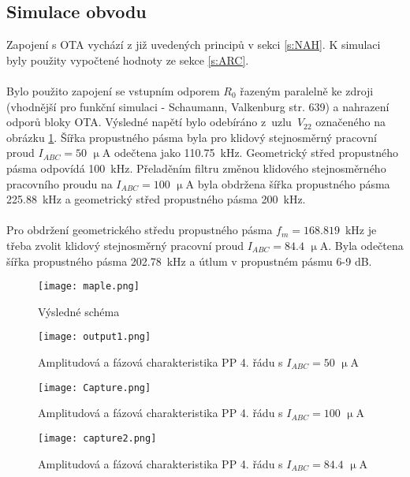 \subsection{Simulace obvodu}
\noindent  Zapojení s OTA vychází z již uvedených principů v sekci \ref{s:NAH}. K simulaci byly použity vypočtené hodnoty ze sekce \ref{s:ARC}. \\
\\
\noindent Bylo použito zapojení se vstupním odporem $R_0$ řazeným paralelně ke zdroji (vhodnější pro funkční simulaci - Schaumann, Valkenburg \cite{13} str. 639) a nahrazení odporů bloky OTA. Výsledné napětí bylo odebíráno z~uzlu~$V_{22}$ označeného na obrázku \ref{s:V1}. Šířka propustného pásma byla pro klidový stejnosměrný pracovní proud $I_{ABC} = 50$ $\upmu$A odečtena jako 110.75~kHz. Geometrický střed propustného pásma odpovídá 100~kHz. Přeladěním filtru změnou klidového stejnosměrného pracovního proudu na $I_{ABC} = 100$ $\upmu$A byla obdržena šířka propustného pásma 225.88~kHz a geometrický střed propustného pásma 200~kHz. \\
\\
Pro obdržení geometrického středu propustného pásma $f_m = 168.819$~kHz je třeba zvolit klidový stejnosměrný pracovní proud $I_{ABC} = 84.4$ $\upmu$A. Byla odečtena šířka propustného pásma 202.78~kHz a útlum v propustném pásmu 6-9 dB. 
\begin{figure}[h]
\centering
\texttt{[image: maple.png]}
\caption{Výsledné schéma\label{s:V1}}
\end{figure}
\begin{figure}[h]
\centering
\texttt{[image: output1.png]}
\caption{Amplitudová a fázová charakteristika PP 4. řádu s $I_{ABC} = 50$ $\upmu$A}
\end{figure}
\begin{figure}[h]
\centering
\texttt{[image: Capture.png]}
\caption{Amplitudová a fázová charakteristika PP 4. řádu s $I_{ABC} = 100$ $\upmu$A}
\end{figure}
\begin{figure}[h]
\centering
\texttt{[image: capture2.png]}
\caption{Amplitudová a fázová charakteristika PP 4. řádu s $I_{ABC} = 84.4$ $\upmu$A}
\end{figure}
